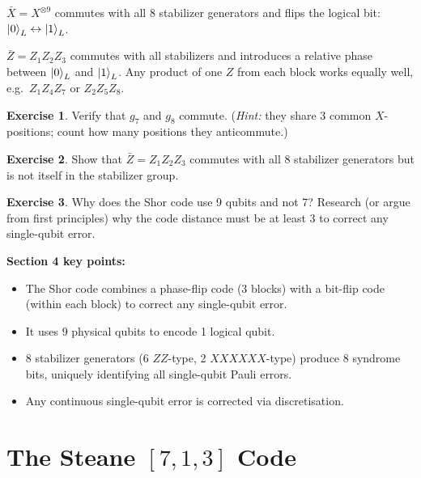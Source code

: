 \documentclass[11pt, a4paper]{article}
\theoremstyle{definition}
\newtheorem{exercise}{Exercise}[section]
\theoremstyle{plain}
\theoremstyle{remark}
\begin{document}
\begin{intuition}
$\bar{X} = X^{\otimes 9}$ commutes with all 8 stabilizer generators and
flips the logical bit: $\ket{0}_L \leftrightarrow \ket{1}_L$.

$\bar{Z} = Z_1 Z_2 Z_3$ commutes with all stabilizers and introduces a
relative phase between $\ket{0}_L$ and $\ket{1}_L$.  Any product of one
$Z$ from each block works equally well, e.g.\ $Z_1 Z_4 Z_7$ or
$Z_2 Z_5 Z_8$.
\end{intuition}

\begin{exercise}
Verify that $g_7$ and $g_8$ commute.  (\emph{Hint:} they share 3 common
$X$-positions; count how many positions they anticommute.)
\end{exercise}

\begin{exercise}
Show that $\bar{Z} = Z_1 Z_2 Z_3$ commutes with all 8 stabilizer generators
but is not itself in the stabilizer group.
\end{exercise}

\begin{exercise}
Why does the Shor code use 9 qubits and not 7?  Research (or argue from
first principles) why the code distance must be at least 3 to correct any
single-qubit error.
\end{exercise}

\begin{summarybox}
\textbf{Section 4 key points:}
\begin{itemize}
  \item The Shor code combines a phase-flip code (3 blocks) with a bit-flip
        code (within each block) to correct any single-qubit error.
  \item It uses 9 physical qubits to encode 1 logical qubit.
  \item 8 stabilizer generators (6 $ZZ$-type, 2 $XXXXXX$-type) produce 8
        syndrome bits, uniquely identifying all single-qubit Pauli errors.
  \item Any continuous single-qubit error is corrected via discretisation.
\end{itemize}
\end{summarybox}

\newpage
\section{The Steane $[7,1,3]$ Code}
\label{sec:steane}
\end{document}
